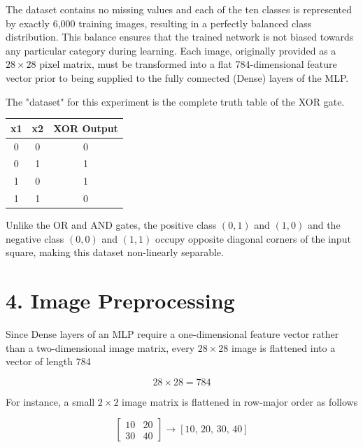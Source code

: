\documentclass[11pt,a4paper]{article}
\begin{document}
\vspace{0.3cm}

The dataset contains no missing values and each of the ten classes is represented by exactly 6{,}000 training images, resulting in a perfectly balanced class distribution. This balance ensures that the trained network is not biased towards any particular category during learning. Each image, originally provided as a $28\times28$ pixel matrix, must be transformed into a flat 784-dimensional feature vector prior to being supplied to the fully connected (Dense) layers of the MLP.





The "dataset" for this experiment is the complete truth table of the XOR gate.

\vspace{0.2cm}

\begin{center}
\begin{tabular}{|c|c|c|}
\hline
\textbf{x1} & \textbf{x2} & \textbf{XOR Output}\\
\hline
0 & 0 & 0\\
\hline
0 & 1 & 1\\
\hline
1 & 0 & 1\\
\hline
1 & 1 & 0\\
\hline
\end{tabular}
\end{center}

\vspace{0.2cm}

Unlike the OR and AND gates, the positive class $(0,1)$ and $(1,0)$ and the negative class $(0,0)$ and $(1,1)$ occupy opposite diagonal corners of the input square, making this dataset non-linearly separable.
\section*{4. Image Preprocessing}

Since Dense layers of an MLP require a one-dimensional feature vector rather than a two-dimensional image matrix, every $28\times28$ image is flattened into a vector of length 784

\[
28 \times 28 = 784
\]

For instance, a small $2\times2$ image matrix is flattened in row-major order as follows

\[
\begin{bmatrix}
10 & 20\\
30 & 40
\end{bmatrix}
\rightarrow
[10,\,20,\,30,\,40]
\]
\end{document}
